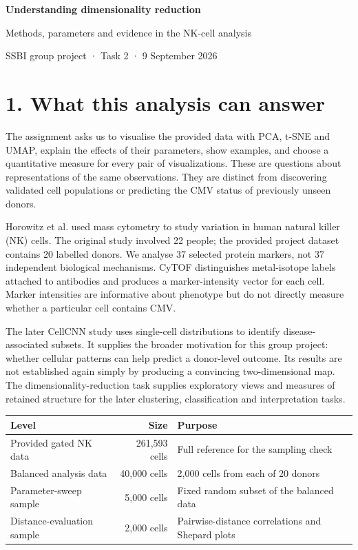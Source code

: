 \documentclass[11pt]{article}
\begin{document}
\begin{center}
{\LARGE\bfseries Understanding dimensionality reduction}\par\medskip
{\large Methods, parameters and evidence in the NK-cell analysis}\par\smallskip
SSBI group project · Task 2 · 9 September 2026
\end{center}

\section*{1. What this analysis can answer}
The assignment asks us to visualise the provided data with PCA, t-SNE and UMAP, explain the effects of their parameters, show examples, and choose a quantitative measure for every pair of visualizations. These are questions about representations of the same observations. They are distinct from discovering validated cell populations or predicting the CMV status of previously unseen donors.

Horowitz et al. used mass cytometry to study variation in human natural killer (NK) cells. The original study involved 22 people; the provided project dataset contains 20 labelled donors. We analyse 37 selected protein markers, not 37 independent biological mechanisms. CyTOF distinguishes metal-isotope labels attached to antibodies and produces a marker-intensity vector for each cell. Marker intensities are informative about phenotype but do not directly measure whether a particular cell contains CMV.\cite{horowitz}

The later CellCNN study uses single-cell distributions to identify disease-associated subsets. It supplies the broader motivation for this group project: whether cellular patterns can help predict a donor-level outcome. Its results are not established again simply by producing a convincing two-dimensional map. The dimensionality-reduction task supplies exploratory views and measures of retained structure for the later clustering, classification and interpretation tasks.\cite{cellcnn}

\begin{center}
\begin{tabular}{lrp{.43\linewidth}}\toprule
Level & Size & Purpose\\\midrule
Provided gated NK data & 261,593 cells & Full reference for the sampling check\\
Balanced analysis data & 40,000 cells & 2,000 cells from each of 20 donors\\
Parameter-sweep sample & 5,000 cells & Fixed random subset of the balanced data\\
Distance-evaluation sample & 2,000 cells & Pairwise-distance correlations and Shepard plots\\\bottomrule
\end{tabular}
\end{center}
\end{document}
